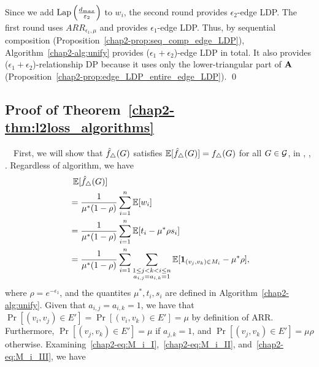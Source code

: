 {Since we add
$\textrm{Lap}\left(\frac{d_{max}}{\varepsilon_2}\right)$
to $w_i$, the second round provides $\epsilon_2$-edge LDP.
The first round uses $ARR_{\epsilon_1,\mu}$ and provides $\epsilon_1$-edge LDP.
Thus, by sequential composition (Proposition~\ref{chap2-prop:seq_comp_edge_LDP}),
Algorithm~\ref{chap2-alg:unify} provides ($\epsilon_1+\epsilon_2$)-edge LDP in total.
It also provides ($\epsilon_1+\epsilon_2$)-relationship DP because it uses only the lower-triangular part of $\mathbf{A}$ (Proposition~\ref{chap2-prop:edge_LDP_entire_edge_LDP}).
\qed

\subsection{Proof of Theorem~\ref{chap2-thm:l2loss_algorithms}}
\label{chap2-sub:prrof_l2loss_algorithms}
{}~~First, we will show that $\hat{f}_\triangle(G)$ satisfies
$\operatorname{\mathbb{E}}[\hat{f}_\triangle(G)] = f_\triangle(G)$ for all $G \in \mathcal{G}$, in \AlgOne{}, \AlgTwo{}, \AlgThree{}.
Regardless of algorithm, we have
\begin{align}
  &\;\operatorname{\mathbb{E}}[\hat{f}_\triangle(G)] \nonumber \\
  &= \frac{1}{\mu^*(1-\rho)}\sum_{i=1}^n \operatorname{\mathbb{E}}[w_i] \nonumber \\
  &= \frac{1}{\mu^*(1-\rho)}\sum_{i=1}^n \operatorname{\mathbb{E}}[t_i - \mu^* \rho s_i] \nonumber \\
  &= \frac{1}{\mu^*(1-\rho)}\sum_{i=1}^n \sum_{\substack{1 \leq j < k < i \leq n \\ a_{i,j} = a_{i,k} = 1}} \operatorname{\mathbb{E}}[\textbf{1}_{(v_j, v_k) \in M_i} - \mu^* \rho],
  \label{chap2-eq:unbias_1}
\end{align}
where $\rho = e^{-\epsilon_1}$, and the quantites $\mu^*, t_i, s_i$ are defined in
Algorithm~\ref{chap2-alg:unify}. Given that $a_{i,j} = a_{i,k} = 1$, we have that
$\Pr[(v_i, v_j) \in E'] = \Pr[(v_i, v_k) \in E'] = \mu$ by definition of ARR.
Furthermore,
$\Pr[(v_j, v_k) \in E'] = \mu$ if $a_{j,k} = 1$, and $\Pr[(v_j, v_k) \in E'] = \mu\rho$ otherwise.
Examining~\eqref{chap2-eq:M_i_I},~\eqref{chap2-eq:M_i_II}, and~\eqref{chap2-eq:M_i_III}, we have
\[
\]}
